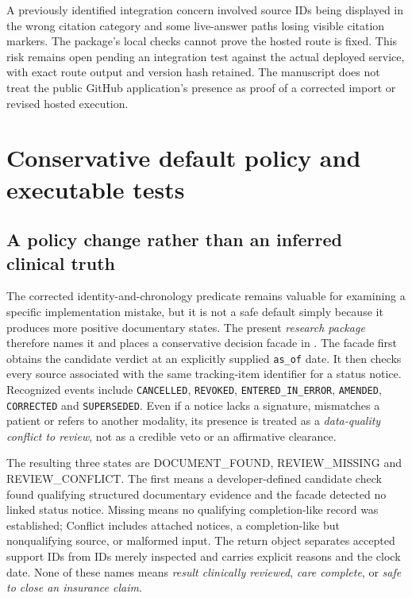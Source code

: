 \documentclass[11pt,twocolumn]{article}
\newcommand{\code}[1]{\texttt{#1}}
\newcommand{\stage}[1]{\textsf{#1}}
\begin{document}
A previously identified integration concern involved source IDs being displayed in the wrong citation category and some live-answer paths losing visible citation markers. The package's local checks cannot prove the hosted route is fixed. This risk remains open pending an integration test against the actual deployed service, with exact route output and version hash retained. The manuscript does not treat the public GitHub application's presence as proof of a corrected import or revised hosted execution.
\section{Conservative default policy and executable tests}\label{sec:policy}
\subsection{A policy change rather than an inferred clinical truth}
The corrected identity-and-chronology predicate remains valuable for examining a specific implementation mistake, but it is not a safe default simply because it produces more positive documentary states. The present \emph{research package} therefore names it  and places a conservative decision facade in . The facade first obtains the candidate verdict at an explicitly supplied \code{as\_of} date. It then checks every source associated with the same tracking-item identifier for a status notice. Recognized events include \code{CANCELLED}, \code{REVOKED}, \code{ENTERED\_IN\_ERROR}, \code{AMENDED}, \code{CORRECTED} and \code{SUPERSEDED}. Even if a notice lacks a signature, mismatches a patient or refers to another modality, its presence is treated as a \emph{data-quality conflict to review}, not as a credible veto or an affirmative clearance.

The resulting three states are \stage{DOCUMENT\_FOUND}, \stage{REVIEW\_MISSING} and \stage{REVIEW\_CONFLICT}. The first means a developer-defined candidate check found qualifying structured documentary evidence and the facade detected no linked status notice. Missing means no qualifying completion-like record was established; Conflict includes attached notices, a completion-like but nonqualifying source, or malformed input. The return object separates accepted support IDs from IDs merely inspected and carries explicit reasons and the clock date. None of these names means \emph{result clinically reviewed}, \emph{care complete}, or \emph{safe to close an insurance claim}.
\end{document}
